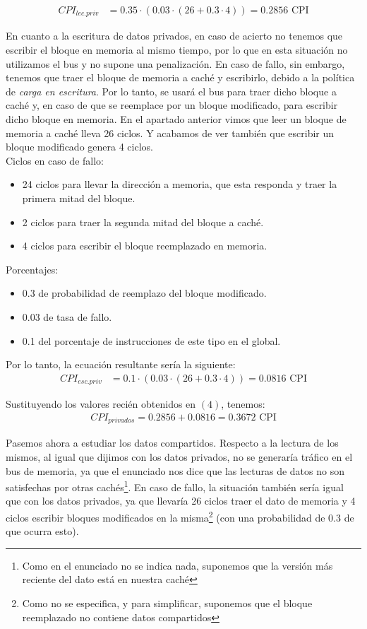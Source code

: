 \documentclass[12pt,a4paper]{article}
\begin{document}
\begin{align*}
CPI_{lec.priv}&=0.35\cdot (0.03\cdot (26 + 0.3\cdot 4))=0.2856\text{ CPI}
\end{align*}

En cuanto a la escritura de datos privados, en caso de acierto no tenemos que escribir el bloque en memoria al mismo tiempo, por lo que en esta situación no utilizamos el bus y no supone una penalización. En caso de fallo, sin embargo, tenemos que traer el bloque de memoria a caché y escribirlo, debido a la política de \textit{carga en escritura}. Por lo tanto, se usará el bus para traer dicho bloque a caché y, en caso de que se reemplace por un bloque modificado, para escribir dicho bloque en memoria. En el apartado anterior vimos que leer un bloque de memoria a caché lleva 26 ciclos. Y acabamos de ver también que escribir un bloque modificado genera 4 ciclos.\\

Ciclos en caso de fallo:
\begin{itemize}
\item 24 ciclos para llevar la dirección a memoria, que esta responda y traer la primera mitad del bloque.
\item 2 ciclos para traer la segunda mitad del bloque a caché.
\item 4 ciclos para escribir el bloque reemplazado en memoria.
\end{itemize}

Porcentajes:
\begin{itemize}
\item 0.3 de probabilidad de reemplazo del bloque modificado.
\item 0.03 de tasa de fallo.
\item 0.1 del porcentaje de instrucciones de este tipo en el global.
\end{itemize}

Por lo tanto, la ecuación resultante sería la siguiente:
\begin{align*}
CPI_{esc.priv}&=0.1\cdot (0.03\cdot (26+0.3\cdot 4))=0.0816\text{ CPI}
\end{align*}

Sustituyendo los valores recién obtenidos en $(4)$, tenemos:
\begin{align*}
CPI_{privados}=0.2856+0.0816=0.3672 \text{ CPI}
\end{align*}

Pasemos ahora a estudiar los datos compartidos. Respecto a la lectura de los mismos, al igual que dijimos con los datos privados, no se generaría tráfico en el bus de memoria, ya que el enunciado nos dice que las lecturas de datos no son satisfechas por otras cachés\footnote{Como en el enunciado no se indica nada, suponemos que la versión más reciente del dato está en nuestra caché}. En caso de fallo, la situación también sería igual que con los datos privados, ya que llevaría 26 ciclos traer el dato de memoria y 4 ciclos escribir bloques modificados en la misma\footnote{Como no se especifica, y para simplificar, suponemos que el bloque reemplazado no contiene datos compartidos} (con una probabilidad de 0.3 de que ocurra esto).\\
\end{document}
